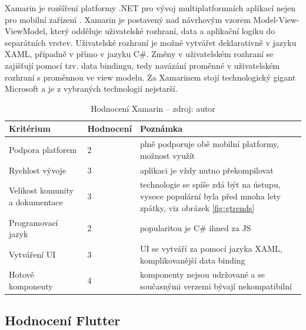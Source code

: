 Xamarin je rozšíření platformy .NET pro vývoj multiplatformních aplikací nejen pro mobilní zařízení \cite{microsoftXamarin}. Xamarin je postavený nad návrhovým vzorem Model-View-ViewModel, který odděluje uživatelské rozhraní, data a aplikační logiku do separátních vrstev. Uživatelské rozhraní je možné vytvářet deklarativně v jazyku XAML, případně v přímo v jazyku C\#. Změny v uživatelském rozhraní se zajišťují pomocí tzv. data bindingu, tedy navázání proměnné v uživatelském rozhraní s proměnnou ve view modelu. Za Xamarinem stojí technologický gigant Microsoft a je z vybraných technologií nejstarší.

\begin{table}[H]
	\begin{tabularx}{\textwidth}{| X | X | X |}
		\hline
		Kritérium                       & Hodnocení & Poznámka \\
		\hline
		Podpora platforem & 2 & plně podporuje obě mobilní platformy, možnost využít         \\
		\hline
		Rychlost vývoje                 & 3 & aplikaci je vždy nutno překompilovat         \\
		\hline
		Velikost komunity a dokumentace & 3 & technologie se spíše zdá být na ústupu, vysoce populární byla před mnoha lety zpátky, viz obrázek \ref{fig:gtrends}         \\
		\hline
		Programovací jazyk              & 2 & popularitou je C\# ihned za JS \cite{novick2017react}         \\
		\hline
		Vytváření UI                    & 3 & UI se vytváří za pomocí jazyka XAML, komplikovanější data binding         \\
		\hline
		Hotové komponenty               & 4 & komponenty nejsou udržované a se současnými verzemi bývají nekompatibilní \\
		\hline
	\end{tabularx}
	\caption[Hodnocení Xamarin]{Hodnocení Xamarin -- zdroj: autor}
\end{table}

\subsection{Hodnocení Flutter}


